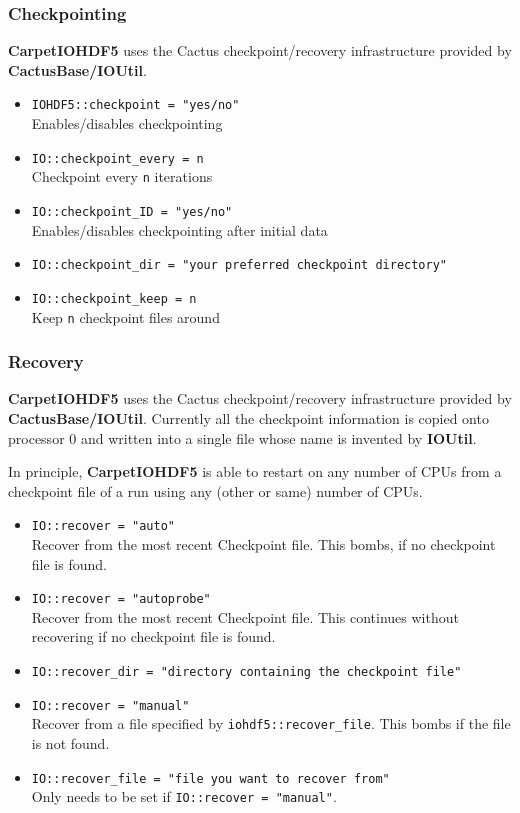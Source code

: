 \subsubsection{Checkpointing}

{\bf CarpetIOHDF5} uses the Cactus checkpoint/recovery infrastructure provided
by {\bf CactusBase/IOUtil}.

\begin{itemize}
  \item {\tt IOHDF5::checkpoint = "yes/no"}\\
        Enables/disables checkpointing
  \item {\tt IO::checkpoint\_every = n}\\
        Checkpoint every {\tt n} iterations
  \item {\tt IO::checkpoint\_ID = "yes/no"}\\
        Enables/disables checkpointing after initial data
  \item {\tt IO::checkpoint\_dir = "your preferred checkpoint directory"} 
  \item {\tt IO::checkpoint\_keep = n}\\
        Keep {\tt n} checkpoint files around
\end{itemize}


\subsubsection{Recovery}

{\bf CarpetIOHDF5} uses the Cactus checkpoint/recovery infrastructure provided
by {\bf CactusBase/IOUtil}.
Currently all the checkpoint information is copied onto processor 0 and
written into a single file whose name is invented by {\bf IOUtil}.

In principle, {\bf CarpetIOHDF5} is able to restart on any number of CPUs
from a checkpoint file of a run using any (other or same) number of CPUs.

\begin{itemize}
  \item {\tt IO::recover = "auto"}\\
        Recover from the most recent Checkpoint file. This bombs,
    if no checkpoint file is found.
  \item {\tt IO::recover = "autoprobe"}\\
        Recover from the most recent Checkpoint file. This continues
    without recovering if no checkpoint file is found.
  \item {\tt IO::recover\_dir = "directory containing the checkpoint file"} 
  \item {\tt IO::recover = "manual"}\\
        Recover from a file specified by {\tt iohdf5::recover\_file}. This
     bombs if the file is not found.
  \item {\tt IO::recover\_file = "file you want to recover from"}\\
        Only needs to be set if {\tt IO::recover = "manual"}.
\end{itemize}


